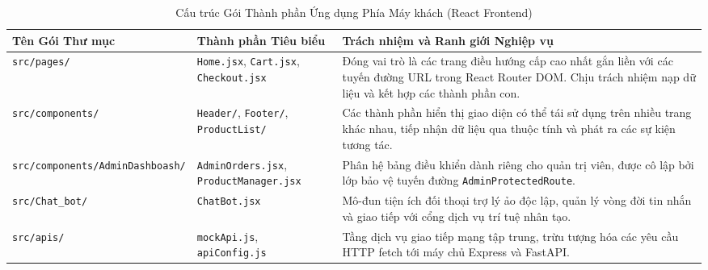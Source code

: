 \begin{table}[H]
\centering
\caption{Cấu trúc Gói Thành phần Ứng dụng Phía Máy khách (React Frontend)}
\label{tab:frontend_components}
\begin{tabularx}{\textwidth}{p{3.2cm}p{3.5cm}X}
\toprule
\textbf{Tên Gói Thư mục} & \textbf{Thành phần Tiêu biểu} & \textbf{Trách nhiệm và Ranh giới Nghiệp vụ} \\
\midrule
\texttt{src/pages/} & \texttt{Home.jsx}, \texttt{Cart.jsx}, \texttt{Checkout.jsx} & Đóng vai trò là các trang điều hướng cấp cao nhất gắn liền với các tuyến đường URL trong React Router DOM. Chịu trách nhiệm nạp dữ liệu và kết hợp các thành phần con. \\
\addlinespace
\texttt{src/components/} & \texttt{Header/}, \texttt{Footer/}, \texttt{ProductList/} & Các thành phần hiển thị giao diện có thể tái sử dụng trên nhiều trang khác nhau, tiếp nhận dữ liệu qua thuộc tính và phát ra các sự kiện tương tác. \\
\addlinespace
\texttt{src/components/AdminDashboash/} & \texttt{AdminOrders.jsx}, \texttt{ProductManager.jsx} & Phân hệ bảng điều khiển dành riêng cho quản trị viên, được cô lập bởi lớp bảo vệ tuyến đường \texttt{AdminProtectedRoute}. \\
\addlinespace
\texttt{src/Chat\_bot/} & \texttt{ChatBot.jsx} & Mô-đun tiện ích đối thoại trợ lý ảo độc lập, quản lý vòng đời tin nhắn và giao tiếp với cổng dịch vụ trí tuệ nhân tạo. \\
\addlinespace
\texttt{src/apis/} & \texttt{mockApi.js}, \texttt{apiConfig.js} & Tầng dịch vụ giao tiếp mạng tập trung, trừu tượng hóa các yêu cầu HTTP fetch tới máy chủ Express và FastAPI. \\
\bottomrule
\end{tabularx}
\end{table}

